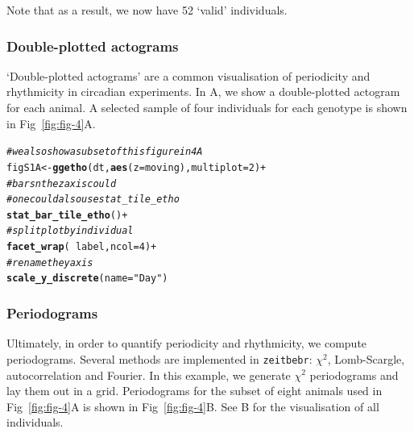 \documentclass[10pt,letterpaper]{article}\usepackage[]{graphicx}\usepackage[]{color}
\makeatletter
\newcommand{\hlnum}[1]{\textcolor[rgb]{0.686,0.059,0.569}{#1}}%
\newcommand{\hlstr}[1]{\textcolor[rgb]{0.192,0.494,0.8}{#1}}%
\newcommand{\hlcom}[1]{\textcolor[rgb]{0.678,0.584,0.686}{\textit{#1}}}%
\newcommand{\hlopt}[1]{\textcolor[rgb]{0,0,0}{#1}}%
\newcommand{\hlstd}[1]{\textcolor[rgb]{0.345,0.345,0.345}{#1}}%
\newcommand{\hlkwb}[1]{\textcolor[rgb]{0.69,0.353,0.396}{#1}}%
\newcommand{\hlkwc}[1]{\textcolor[rgb]{0.333,0.667,0.333}{#1}}%
\newcommand{\hlkwd}[1]{\textcolor[rgb]{0.737,0.353,0.396}{\textbf{#1}}}%
\newenvironment{kframe}{%
 \def\at@end@of@kframe{}%
 \ifinner\ifhmode%
  \def\at@end@of@kframe{\end{minipage}}%
  \begin{minipage}{\columnwidth}%
 \fi\fi%
 \def\FrameCommand##1{\hskip\@totalleftmargin \hskip-\fboxsep
 \colorbox{shadecolor}{##1}\hskip-\fboxsep
     \hskip-\linewidth \hskip-\@totalleftmargin \hskip\columnwidth}%
 \MakeFramed {\advance\hsize-\width
   \@totalleftmargin\z@ \linewidth\hsize
   \@setminipage}}%
 {\par\unskip\endMakeFramed%
 \at@end@of@kframe}
\newenvironment{knitrout}{}{} %
\makeatother
\begin{document}
Note that as a result, we now have 52 `valid' individuals.


\subsubsection*{Double-plotted actograms}
`Double-plotted actograms' are a common visualisation of periodicity and rhythmicity in circadian experiments.
In  A, we show a double-plotted actogram for each animal.
A selected sample of four individuals for each genotype is shown in Fig~\ref{fig:fig-4}A.

\begin{knitrout}
\color{fgcolor}\begin{kframe}
\begin{alltt}
\hlcom{# we also show a subset of this figure in 4A}
\hlstd{figS1A} \hlkwb{<-} \hlkwd{ggetho}\hlstd{(dt,} \hlkwd{aes}\hlstd{(}\hlkwc{z} \hlstd{= moving),} \hlkwc{multiplot} \hlstd{=} \hlnum{2}\hlstd{)} \hlopt{+}
            \hlcom{# bars n the z axis could }
            \hlcom{# one could also use stat_tile_etho}
            \hlkwd{stat_bar_tile_etho}\hlstd{()} \hlopt{+}
            \hlcom{# split plot by individual}
            \hlkwd{facet_wrap}\hlstd{(} \hlopt{~} \hlstd{label,} \hlkwc{ncol} \hlstd{=} \hlnum{4}\hlstd{)} \hlopt{+}
            \hlcom{# rename the y axis}
            \hlkwd{scale_y_discrete}\hlstd{(}\hlkwc{name} \hlstd{=} \hlstr{"Day"}\hlstd{)}
\end{alltt}
\end{kframe}
\end{knitrout}




\subsubsection*{Periodograms}
Ultimately, in order to quantify periodicity and rhythmicity, we compute periodograms.
Several methods are implemented in \texttt{zeitbebr}: $\chi{}^2$, Lomb-Scargle, autocorrelation 
and Fourier.
In this example, we generate $\chi{}^2$ periodograms and lay them out in a grid.
Periodograms for the subset of eight animals used in Fig~\ref{fig:fig-4}A is shown in Fig~\ref{fig:fig-4}B. 
See B for the visualisation of all individuals.
\end{document}
